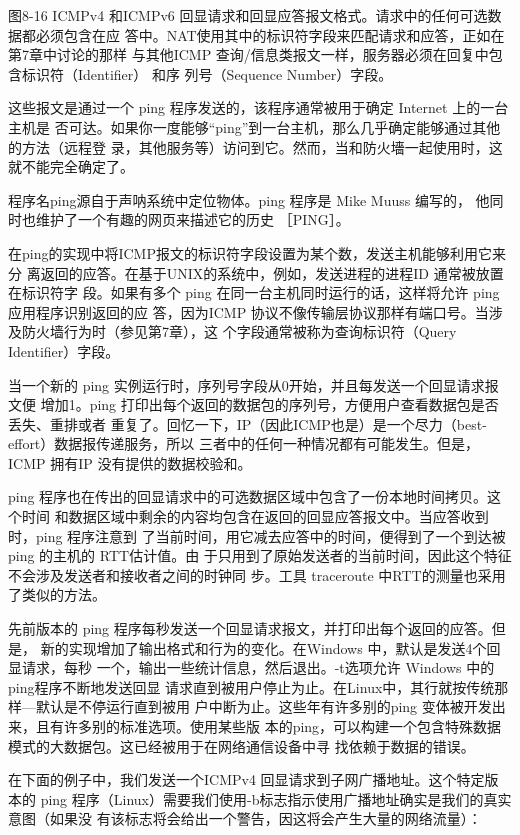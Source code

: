 图8-16 ICMPv4 和ICMPv6 回显请求和回显应答报文格式。请求中的任何可选数据都必须包含在应
答中。NAT使用其中的标识符字段来匹配请求和应答，正如在第7章中讨论的那样
与其他ICMP 查询/信息类报文一样，服务器必须在回复中包含标识符（Identifier） 和序
列号（Sequence Number）字段。

这些报文是通过一个 ping 程序发送的，该程序通常被用于确定 Internet 上的一台主机是
否可达。如果你一度能够“ping”到一台主机，那么几乎确定能够通过其他的方法（远程登
录，其他服务等）访问到它。然而，当和防火墻一起使用时，这就不能完全确定了。

\begin{tcolorbox}
  程序名ping源自于声呐系统中定位物体。ping 程序是 Mike Muuss 编写的，
  他同时也维护了一个有趣的网页来描述它的历史 ［PING］。
\end{tcolorbox}

在ping的实现中将ICMP报文的标识符字段设置为某个数，发送主机能够利用它来分
离返回的应答。在基于UNIX的系统中，例如，发送进程的进程ID 通常被放置在标识符字
段。如果有多个 ping 在同一台主机同时运行的话，这样将允许 ping 应用程序识别返回的应
答，因为ICMP 协议不像传输层协议那样有端口号。当涉及防火墙行为时（参见第7章），这
个字段通常被称为查询标识符（Query Identifier）字段。

当一个新的 ping 实例运行时，序列号字段从0开始，并且每发送一个回显请求报文便
增加1。ping 打印出每个返回的数据包的序列号，方便用户查看数据包是否丢失、重排或者
重复了。回忆一下，IP（因此ICMP也是）是一个尽力（best-effort）数据报传递服务，所以
三者中的任何一种情况都有可能发生。但是，ICMP 拥有IP 没有提供的数据校验和。

ping 程序也在传出的回显请求中的可选数据区域中包含了一份本地时间拷贝。这个时间
和数据区域中剩余的内容均包含在返回的回显应答报文中。当应答收到时，ping 程序注意到
了当前时间，用它减去应答中的时间，便得到了一个到达被 ping 的主机的 RTT估计值。由
于只用到了原始发送者的当前时间，因此这个特征不会涉及发送者和接收者之间的时钟同
步。工具 traceroute 中RTT的测量也采用了类似的方法。

先前版本的 ping 程序每秒发送一个回显请求报文，并打印出每个返回的应答。但是，
新的实现增加了输出格式和行为的变化。在Windows 中，默认是发送4个回显请求，每秒
一个，输出一些统计信息，然后退出。-t选项允许 Windows 中的ping程序不断地发送回显
请求直到被用户停止为止。在Linux中，其行就按传统那样—默认是不停运行直到被用
户中断为止。这些年有许多别的ping 变体被开发出来，且有许多别的标准选项。使用某些版
本的ping，可以构建一个包含特殊数据模式的大数据包。这已经被用于在网络通信设备中寻
找依赖于数据的错误。

在下面的例子中，我们发送一个ICMPv4 回显请求到子网广播地址。这个特定版本的
ping 程序（Linux）需要我们使用-b标志指示使用广播地址确实是我们的真实意图（如果没
有该标志将会给出一个警告，因这将会产生大量的网络流量）：

